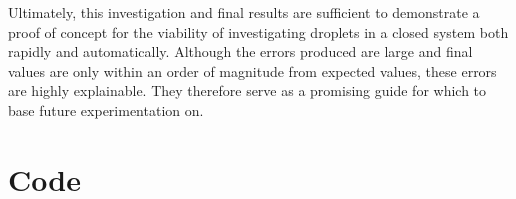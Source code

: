 \documentclass{physics_article_B}
\begin{document}
    Ultimately, this investigation and final results are sufficient to demonstrate a proof of concept for the viability of investigating droplets in a closed system both rapidly and automatically. Although the errors produced are large and final values are only within an order of magnitude from expected values, these errors are highly explainable. They therefore serve as a promising guide for which to base future experimentation on.

\newpage



\newpage
\appendix{}
\section{Code}
\end{document}
